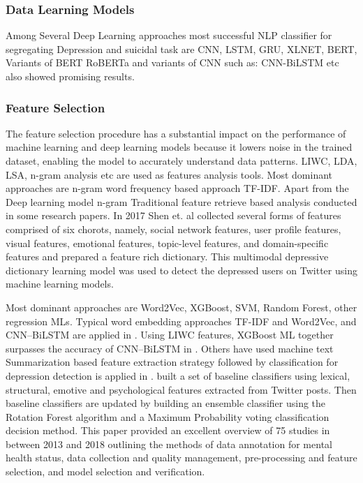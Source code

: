 \documentclass[sn-mathphys,Numbered]{sn-jnl}%
\theoremstyle{thmstyleone}%
\theoremstyle{thmstyletwo}%
\theoremstyle{thmstylethree}%
\begin{document}
\subsubsection{Data Learning Models}
Among Several Deep Learning approaches most successful NLP classifier for segregating Depression and suicidal task are CNN, LSTM, GRU, XLNET, BERT, Variants of BERT RoBERTa and variants of CNN such as: CNN-BiLSTM etc \cite{aldhyani2022detecting, wang2020depression, shetty2020predicting} also showed promising results. 

\subsubsection{Feature Selection} 
The feature selection procedure has a substantial impact on the performance of machine learning and deep learning models because it lowers noise in the trained dataset, enabling the model to accurately understand data patterns. LIWC, LDA, LSA, n-gram analysis \cite{pennebaker2001linguistic, tadesse2019detection} etc are used as features analysis tools. 
Most dominant approaches are n-gram word frequency based approach TF-IDF. Apart from the Deep learning model n-gram Traditional feature retrieve based analysis conducted in some research papers. In 2017 Shen et. al \cite{harvesting_social_media} collected several forms of features comprised of six chorots, namely, social network features, user profile features, visual features, emotional features, topic-level features, and domain-specific features and prepared a feature rich dictionary. This multimodal depressive dictionary learning model was used to detect the depressed users on Twitter using machine learning models. 

Most dominant approaches are Word2Vec, XGBoost, SVM, Random Forest, other regression MLs. Typical word embedding approaches TF-IDF and Word2Vec, and CNN–BiLSTM are applied in  \cite{aldhyani2022detecting}. Using LIWC features, XGBoost ML together surpasses the accuracy of CNN–BiLSTM in  \cite{aldhyani2022detecting}. Others have used machine text Summarization based feature extraction strategy followed by classification for depression detection is applied in \cite{zogan2021depressionnet}. \cite{burnap2015machine}built a set of baseline classifiers using lexical, structural, emotive and psychological features extracted from Twitter posts. Then baseline classifiers are updated by building an ensemble classifier using the Rotation Forest algorithm and a Maximum Probability voting classification decision method. \cite{chancellor2020methods} This paper provided an excellent overview of 75 studies in between 2013 and 2018 outlining the methods of data annotation for mental health status, data collection and quality management, pre-processing and feature selection, and model selection and verification. 
\end{document}
